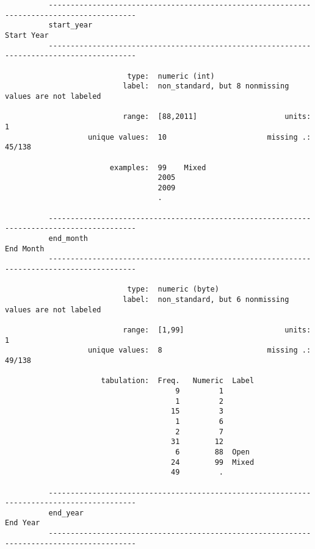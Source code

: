 \documentclass{article}
\begin{document}
\begin{verbatim}
          ------------------------------------------------------------------------------------------
          start_year                                                                      Start Year
          ------------------------------------------------------------------------------------------
          
                            type:  numeric (int)
                           label:  non_standard, but 8 nonmissing values are not labeled
          
                           range:  [88,2011]                    units:  1
                   unique values:  10                       missing .:  45/138
          
                        examples:  99    Mixed
                                   2005  
                                   2009  
                                   .     
          
          ------------------------------------------------------------------------------------------
          end_month                                                                        End Month
          ------------------------------------------------------------------------------------------
          
                            type:  numeric (byte)
                           label:  non_standard, but 6 nonmissing values are not labeled
          
                           range:  [1,99]                       units:  1
                   unique values:  8                        missing .:  49/138
          
                      tabulation:  Freq.   Numeric  Label
                                       9         1  
                                       1         2  
                                      15         3  
                                       1         6  
                                       2         7  
                                      31        12  
                                       6        88  Open
                                      24        99  Mixed
                                      49         .  
          
          ------------------------------------------------------------------------------------------
          end_year                                                                          End Year
          ------------------------------------------------------------------------------------------
          

\end{verbatim}
\end{document}
